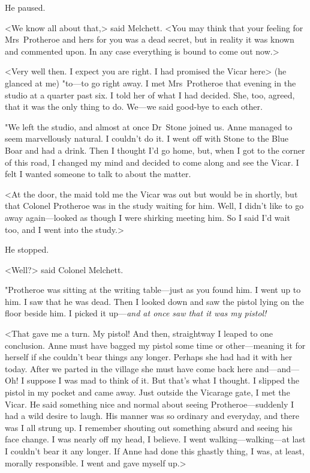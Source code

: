 He paused.

<We know all about that,> said Melchett. <You may think that your feeling for Mrs~Protheroe and hers for you was a dead secret, but in reality it was known and commented upon. In any case everything is bound to come out now.>

<Very well then. I expect you are right. I had promised the Vicar here> (he glanced at me) "to—to go right away. I met Mrs~Protheroe that evening in the studio at a quarter past six. I told her of what I had decided. She, too, agreed, that it was the only thing to do. We—we said good-bye to each other.

"We left the studio, and almost at once Dr~Stone joined us. Anne managed to seem marvellously natural. I couldn't do it. I went off with Stone to the Blue Boar and had a drink. Then I thought I'd go home, but, when I got to the corner of this road, I changed my mind and decided to come along and see the Vicar. I felt I wanted someone to talk to about the matter.

<At the door, the maid told me the Vicar was out but would be in shortly, but that Colonel Protheroe was in the study waiting for him. Well, I didn't like to go away again—looked as though I were shirking meeting him. So I said I'd wait too, and I went into the study.>

He stopped.

<Well?> said Colonel Melchett.

"Protheroe was sitting at the writing table—just as you found him. I went up to him. I saw that he was dead. Then I looked down and saw the pistol lying on the floor beside him. I picked it up—\emph{and at once saw that it was my pistol!}

<That gave me a turn. My pistol! And then, straightway I leaped to one conclusion. Anne must have bagged my pistol some time or other—meaning it for herself if she couldn't bear things any longer. Perhaps she had had it with her today. After we parted in the village she must have come back here and—and—Oh! I suppose I was mad to think of it. But that's what I thought. I slipped the pistol in my pocket and came away. Just outside the Vicarage gate, I met the Vicar. He said something nice and normal about seeing Protheroe—suddenly I had a wild desire to laugh. His manner was so ordinary and everyday, and there was I all strung up. I remember shouting out something absurd and seeing his face change. I was nearly off my head, I believe. I went walking—walking—at last I couldn't bear it any longer. If Anne had done this ghastly thing, I was, at least, morally responsible. I went and gave myself up.>

